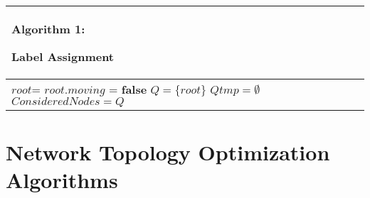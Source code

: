 \documentclass[10pt,conference]{IEEEtran}
\begin{document}
\begin{algorithm}[t]

\begin{tabular}[c]{p{8cm}}


\hline
{\scriptsize \begin{bf}Algorithm 1: \end{bf} Label Assignment }\\
\hline
\SetKwFunction{GC}{GetChildren}
\SetKwFunction{GR}{GetRoot}
\SetKwFunction{Label}{Label}
\SetKwFunction{PL}{ParentLabel}
\SetKwFunction{GDL}{GetUniqueDesiredLabel}

{\scriptsize \KwIn{$\mathcal{G}_{f} = \{\mathcal{V},\mathcal{E}_{f}\}$ } \tcc{desired graph with corresponding prefix label from
$\mathcal{G}_{i}$}

\KwOut{$\mathcal{G}_{f}$  with moving indicators and anchor-node and
  desired labels}

$root$=\GR{$\mathcal{V}$}\;
$root.moving$ = {\bf false}\;
$Q= \{ root \}$\;
$Qtmp = \emptyset$\;
$ConsideredNodes = Q$\;

\While{$|ConsideredNodes| < |\mathcal{V}|$}{

\ForEach{v$\in$Q}{

$\mathcal{C}$ = \GC{v}\;
\If{$\mathcal{C} \neq \emptyset$ }
{
$Qtmp = Qtmp \cup \mathcal{C}$\;
$ConsideredNodes = ConsideredNodes \cup  \mathcal{C}$\;

\eIf{ v.moving == {\bf false} }
{
\ForEach{$c \in \mathcal{C}$}
{
\eIf{\PL{c}== \Label{v}}
{
$c.moving$ = {\bf false}\;
}
{
$c.moving$ = {\bf true}\;
}
}
\ForEach{$c \in \mathcal{C}$}
{
\If{$c.moving$ == {\bf true}}
{
$c.anchorlabel = v.label$\;
$c.desiredlabel$ = \GDL{}\;}}}
{
\ForEach{$c \in \mathcal{C}$}{

$c.moving$ = {\bf true}\;
$c.anchorlabel = v.anchorlabel$\;
$c.desiredlabel$ = \GDL{}\;

}

}

}

}

Q = Qtmp\;

}

}
\\
\hline


\end{tabular}

\end{algorithm}





\section{Network Topology Optimization Algorithms}
\label{sec:opt}
\end{document}
